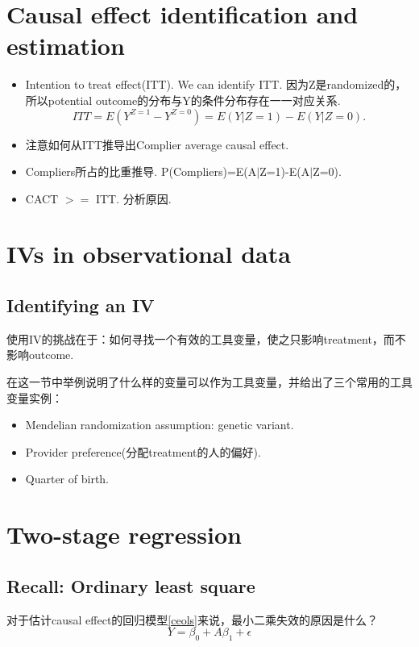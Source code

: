 \section{Causal effect identification and estimation}
\begin{itemize}
	\item Intention to treat effect(ITT).  We can identify ITT. 因为Z是randomized的，所以potential outcome的分布与Y的条件分布存在一一对应关系. 
	\begin{equation}
	ITT=E(Y^{Z=1}-Y^{Z=0})=E(Y|Z=1)-E(Y|Z=0).
	\end{equation} 
	\item 注意如何从ITT推导出Complier average causal effect.
	\item Compliers所占的比重推导. P(Compliers)=E(A$|$Z=1)-E(A$|$Z=0).
	\item CACT $>=$ ITT. 分析原因.
\end{itemize}

\section{IVs in observational data}
\subsection{Identifying an IV}
使用IV的挑战在于：如何寻找一个有效的工具变量，使之只影响treatment，而不影响outcome.

在这一节中举例说明了什么样的变量可以作为工具变量，并给出了三个常用的工具变量实例：
\begin{itemize}
	\item Mendelian randomization assumption: genetic variant.
	\item Provider preference(分配treatment的人的偏好).
	\item Quarter of birth.
\end{itemize}

\section{Two-stage regression}
\subsection{Recall: Ordinary least square}
对于估计causal effect的回归模型\ref{ceols}来说，最小二乘失效的原因是什么？
\begin{equation}
\label{ceols}
Y=\beta_0 + A\beta_1 + \epsilon
\end{equation}

